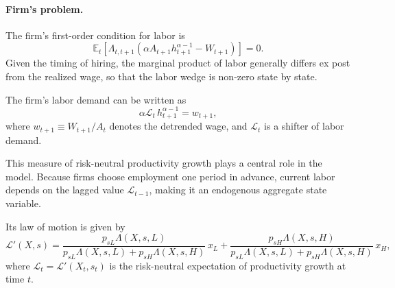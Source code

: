 \paragraph{Firm's problem.}

The firm's first-order condition for labor is
\begin{equation}
\mathbb E_t\!\left[
\Lambda_{t,t+1}
\left(
\alpha A_{t+1} h_{t+1}^{\alpha-1}
-
W_{t+1}
\right)
\right]
=
0.
\end{equation}
Given the timing of hiring, the marginal product of labor generally differs ex post from
the realized wage, so that the labor wedge is non-zero state by state.

The firm's labor demand can be written as
\begin{equation}
\alpha \mathcal L_t\, h_{t+1}^{\alpha-1}
=
w_{t+1},
\label{eq:labor_demand}
\end{equation}
where $w_{t+1}\equiv W_{t+1}/A_t$ denotes the detrended wage, and
$\mathcal L_t$ is a shifter of labor demand.


This measure of risk-neutral productivity growth plays a central role in the model.
Because firms choose employment one period in advance, current labor depends on the
lagged value $\mathcal L_{t-1}$, making it an endogenous aggregate state variable.

Its law of motion is given by
\begin{equation}\label{eq: E_prime}
\mathcal L'(X,s)
=
\frac{p_{sL}\Lambda(X,s,L)}{p_{sL}\Lambda(X,s,L)+p_{sH}\Lambda(X,s,H)}\,x_L
+
\frac{p_{sH}\Lambda(X,s,H)}{p_{sL}\Lambda(X,s,L)+p_{sH}\Lambda(X,s,H)}\,x_H,
\end{equation}
where $\mathcal{L}_t = \mathcal L'(X_t,s_t)$ is the risk-neutral expectation of productivity growth at time $t$.



